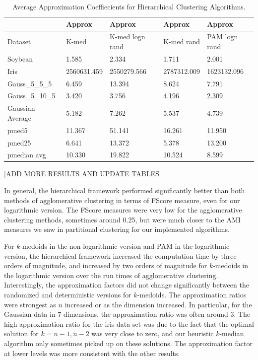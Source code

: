 \documentclass[conference, 10pt, final]{IEEEtran}
\begin{document}
\begin{table}[!t]
\label{fig:hier_results_approx}
\caption{Average Approximation Coeffiecients for Hierarchical Clustering Algorithms.}
\centering
\begin{tabular}{ | l | l | l | l | l | }
\hline
	   & Approx & Approx & Approx & Approx \\ \hline
	Dataset & K-med & K-med logn rand & K-med rand & PAM logn rand \\ \hline
	Soybean & 1.585 & 2.334 & 1.711 & 2.001 \\ 
	Iris & 2560631.459 & 2550279.566 & 2787312.009 & 1623132.096 \\ 
	Gauss\_5\_5\_5 & 6.459 & 13.394 & 8.624 & 7.791 \\
	Gauss\_5\_10\_5 &  3.420 & 3.756 & 4.196 & 2.309  \\
	Gaussian Average & 5.182 & 7.262  & 5.537 & 4.739 \\ 
	pmed5 & 11.367 & 51.141 & 16.261 & 11.950 \\ 
	pmed25 & 6.641 & 13.372 & 5.378 & 13.200 \\ 
	pmedian avg & 10.330 & 19.822 & 10.524 & 8.599 \\ \hline
\end{tabular}
\end{table}

[ADD MORE RESULTS AND UPDATE TABLES]

In general, the hierarchical framework performed significantly better than both methods of agglomerative clustering in terms of FScore measure, even for our logarithmic version. The FScore measures were very low for the agglomerative clustering methods, sometimes around 0.25, but were much closer to the AMI measures we saw in partitional clustering for our implemented algorithms. 

For $k$-medoids in the non-logarithmic version and PAM in the logarithmic version, the hierarchical framework increased the computation time by three orders of magnitude, and increased by two orders of magnitude for $k$-medoids in the logarithmic version over the run times of agglomerative clustering. Interestingly, the approximation factors did not change significantly between the randomized and deterministic versions for $k$-medoids. The approximation ratios were strongest as $n$ increased or as the dimension increased. In particular, for the Gaussian data in 7 dimensions, the approximation ratio was often around 3.  The high approximation ratio for the iris data set was due to the fact that the optimal solution for $k = n-1, n-2$ was very close to zero, and our heuristic $k$-median algorithm only sometimes picked up on these solutions. The approximation factor at lower levels was more consistent with the other results. 
\end{document}
